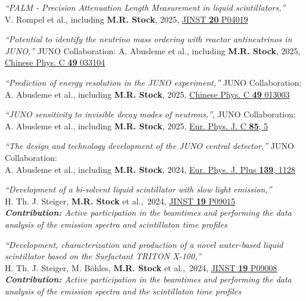 \documentclass[letterpaper,12pt, oneside]{article}
\begin{document}
\begin{etaremune}[leftmargin=1.65em]
\item \textit{“PALM - Precision Attenuation Length Measurement in liquid scintillators,”} \\ V. Rompel et al., including \textbf{M.R. Stock}, 2025, \href{https://doi.org/10.1088/1748-0221/20/04/P04019}{JINST \textbf{20} P04019}

\item \textit{“Potential to identify the neutrino mass ordering with reactor antineutrinos in JUNO,”} JUNO Collaboration: A. Abusleme et al., including \textbf{M.R. Stock}, 2025, \href{https://doi.org/10.1088/1674-1137/ad7f3e}{Chinese Phys. C \textbf{49} 033104}

\item \textit{“Prediction of energy resolution in the JUNO experiment,”} JUNO Collaboration: \\ A. Abusleme et al., including \textbf{M.R. Stock}, 2025,
\href{https://doi.org/10.1088/1674-1137/ad83aa}{Chinese Phys. C \textbf{49} 013003}

\item \textit{“JUNO sensitivity to invisible decay modes of neutrons,”}, JUNO Collaboration: \\ A. Abusleme et al., including \textbf{M.R. Stock}, 2025, \href{https://doi.org/10.1140/epjc/s10052-024-13638-0}{Eur. Phys. J. C \textbf{85}, 5}

\item \textit{“The design and technology development of the JUNO central detector,”} JUNO Collaboration: \\
A. Abusleme et al., including \textbf{M.R. Stock}, 2024,
\href{https://doi.org/10.1140/epjp/s13360-024-05830-8}{Eur. Phys. J. Plus \textbf{139}, 1128}

\item \textit{“Development of a bi-solvent liquid scintillator with slow light emission,”} \\ H. Th. J. Steiger, \textbf{M.R. Stock} et al.,~2024, \href{https://doi.org/10.1088/1748-0221/19/09/P09015}{JINST \textbf{19} P09015}
\\
\textit{\textbf{Contribution:} Active participation in the beamtimes and performing the data analysis of the emission spectra and scintillaton time profiles}

\item \textit{“Development, characterization and production of a novel water-based liquid scintillator based on the Surfactant TRITON X-100,”} \\ H. Th. J. Steiger, M. Böhles, \textbf{M.R. Stock} et al.,~2024, \href{https://doi.org/10.1088/1748-0221/19/09/P09008}{JINST \textbf{19} P09008}
\\
\textit{\textbf{Contribution:} Active participation in the beamtimes and performing the data analysis of the emission spectra and the scintillaton time profiles}


\end{etaremune}
\end{document}
